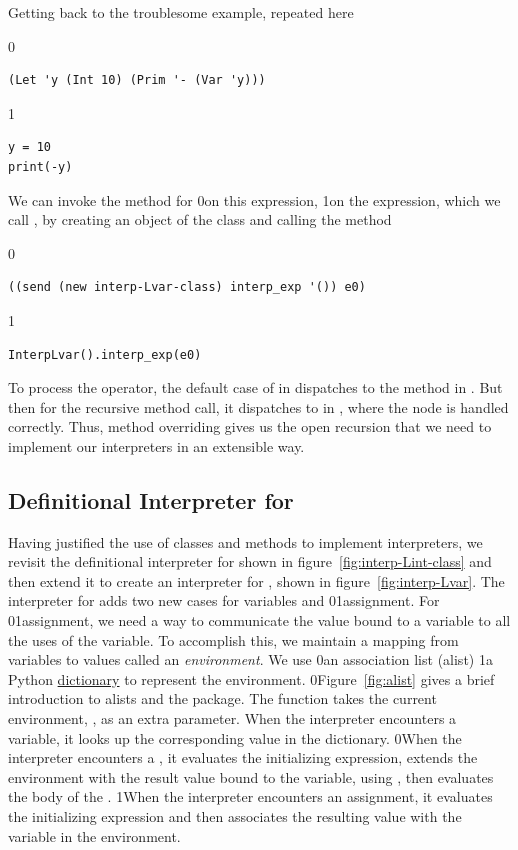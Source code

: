 \documentclass[7x10]{TimesAPriori_MIT}%
\def\racketEd{0}
\def\pythonEd{1}
\def\edition{0}
\newcommand{\racket}[1]{{\if\edition\racketEd{#1}\fi}}
\newcommand{\python}[1]{{\if\edition\pythonEd #1\fi}}
\numberwithin{theorem}{chapter}
\numberwithin{definition}{chapter}
\numberwithin{equation}{chapter}
\begin{document}
Getting back to the troublesome example, repeated here
{\if\edition\racketEd  
\begin{lstlisting}
(Let 'y (Int 10) (Prim '- (Var 'y)))
\end{lstlisting}
\fi}
{\if\edition\pythonEd
\begin{lstlisting}
y = 10
print(-y)
\end{lstlisting}
\fi}
\noindent We can invoke the  method for \LangVar{}
\racket{on this expression,}
\python{on the  expression,}
%
which we call , by creating an object of the \LangVar{} class
and calling the  method
{\if\edition\racketEd
\begin{lstlisting}
((send (new interp-Lvar-class) interp_exp '()) e0)
\end{lstlisting}
\fi}
{\if\edition\pythonEd
\begin{lstlisting}
InterpLvar().interp_exp(e0)
\end{lstlisting}
\fi}
\noindent To process the \code{-} operator, the default case of
 in \LangVar{} dispatches to the 
method in \LangInt{}. But then for the recursive method call, it
dispatches to  in \LangVar{}, where the
 node is handled correctly. Thus, method overriding gives us
the open recursion that we need to implement our interpreters in an
extensible way.


\subsection{Definitional Interpreter for \LangVar{}}
\label{sec:interp-Lvar}

Having justified the use of classes and methods to implement
interpreters, we revisit the definitional interpreter for \LangInt{}
shown in figure~\ref{fig:interp-Lint-class} and then extend it to
create an interpreter for \LangVar{}, shown in figure~\ref{fig:interp-Lvar}.
The interpreter for \LangVar{} adds two new  cases for
variables and \racket{}\python{assignment}. For
\racket{}\python{assignment}, we need a way to communicate the
value bound to a variable to all the uses of the variable. To
accomplish this, we maintain a mapping from variables to values called
an \emph{environment}.
%
We use
%
\racket{an association list (alist) }%
%
\python{a Python \href{https://docs.python.org/3.10/library/stdtypes.html\#mapping-types-dict}{dictionary} }%
%
to represent the environment.
%
\racket{Figure~\ref{fig:alist} gives a brief introduction to alists
  and the \code{racket/dict} package.}
%
The  function takes the current environment,
, as an extra parameter.  When the interpreter encounters a
variable, it looks up the corresponding value in the dictionary.
%
\racket{When the interpreter encounters a , it evaluates the
  initializing expression, extends the environment with the result
  value bound to the variable, using \code{dict-set}, then evaluates
  the body of the \key{Let}.}
%
\python{When the interpreter encounters an assignment, it evaluates
  the initializing expression and then associates the resulting value
  with the variable in the environment.}
\end{document}

